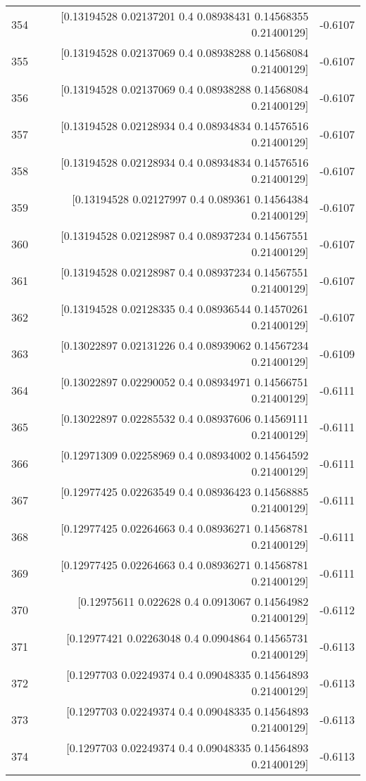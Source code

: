 \begin{longtable}{lrr}
354 & [0.13194528 0.02137201 0.4        0.08938431 0.14568355 0.21400129] & -0.6107 \\
355 & [0.13194528 0.02137069 0.4        0.08938288 0.14568084 0.21400129] & -0.6107 \\
356 & [0.13194528 0.02137069 0.4        0.08938288 0.14568084 0.21400129] & -0.6107 \\
357 & [0.13194528 0.02128934 0.4        0.08934834 0.14576516 0.21400129] & -0.6107 \\
358 & [0.13194528 0.02128934 0.4        0.08934834 0.14576516 0.21400129] & -0.6107 \\
359 & [0.13194528 0.02127997 0.4        0.089361   0.14564384 0.21400129] & -0.6107 \\
360 & [0.13194528 0.02128987 0.4        0.08937234 0.14567551 0.21400129] & -0.6107 \\
361 & [0.13194528 0.02128987 0.4        0.08937234 0.14567551 0.21400129] & -0.6107 \\
362 & [0.13194528 0.02128335 0.4        0.08936544 0.14570261 0.21400129] & -0.6107 \\
363 & [0.13022897 0.02131226 0.4        0.08939062 0.14567234 0.21400129] & -0.6109 \\
364 & [0.13022897 0.02290052 0.4        0.08934971 0.14566751 0.21400129] & -0.6111 \\
365 & [0.13022897 0.02285532 0.4        0.08937606 0.14569111 0.21400129] & -0.6111 \\
366 & [0.12971309 0.02258969 0.4        0.08934002 0.14564592 0.21400129] & -0.6111 \\
367 & [0.12977425 0.02263549 0.4        0.08936423 0.14568885 0.21400129] & -0.6111 \\
368 & [0.12977425 0.02264663 0.4        0.08936271 0.14568781 0.21400129] & -0.6111 \\
369 & [0.12977425 0.02264663 0.4        0.08936271 0.14568781 0.21400129] & -0.6111 \\
370 & [0.12975611 0.022628   0.4        0.0913067  0.14564982 0.21400129] & -0.6112 \\
371 & [0.12977421 0.02263048 0.4        0.0904864  0.14565731 0.21400129] & -0.6113 \\
372 & [0.1297703  0.02249374 0.4        0.09048335 0.14564893 0.21400129] & -0.6113 \\
373 & [0.1297703  0.02249374 0.4        0.09048335 0.14564893 0.21400129] & -0.6113 \\
374 & [0.1297703  0.02249374 0.4        0.09048335 0.14564893 0.21400129] & -0.6113 \\

\end{longtable}
